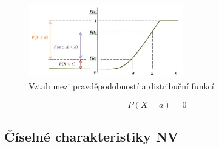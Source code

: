 \begin{itemize}
\begin{figure}[H]
		\end{figure}
		\begin{figure}[H]
			\centering
			\includegraphics[width=0.6\textwidth]{assets/11_vztah_prav_dist_snv}
			\caption{Vztah mezi pravděpodobností a distribuční funkcí}
		\end{figure}
		$$P(X = a) = 0$$
	\end{itemize}

\subsection{Číselné charakteristiky NV}

